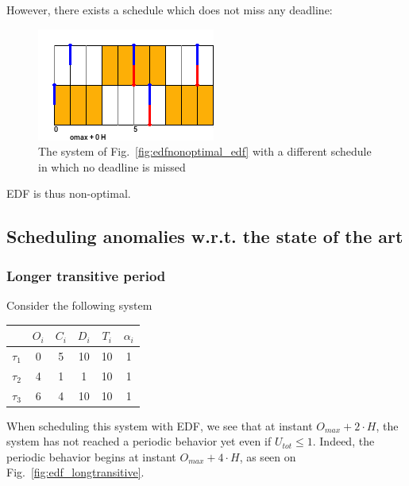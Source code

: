 \documentclass[a4paper,10pt]{article}
\begin{document}
        However, there exists a schedule which does not miss any deadline:\\

        \begin{figure}[H]
        \begin{center}
            \includegraphics{figs/edfNonOptimal_PALLF.png}
            \caption{The system of Fig.~\ref{fig:edfnonoptimal_edf} with a different schedule in which no deadline is missed}
            \label{fig:edfnonoptimal_pallf}
        \end{center}
        \end{figure}

        EDF is thus non-optimal.

    \subsection{Scheduling anomalies w.r.t. the state of the art}


        \subsubsection{Longer transitive period}
        Consider the following system

        \begin{center}
            \begin{tabular}{|r|c|c|c|c|c|}
                \hline
                            & $O_i$ & $C_i$ & $D_i$ & $T_i$ & $\alpha_i$ \\ \hline
                $\tau_1$    & 0     & 5     & 10   & 10    & 1     \\ \hline
                $\tau_2$    & 4     & 1     & 1    & 10    & 1     \\ \hline
                $\tau_3$    & 6     & 4     & 10   & 10    & 1     \\ \hline
            \end{tabular}
        \end{center}

        When scheduling this system with EDF, we see that at instant $O_{max} + 2 \cdot H$, the system has not reached a periodic behavior yet even if $U_{tot} \leqslant 1$. Indeed, the periodic behavior begins at instant $O_{max} + 4 \cdot H$, as seen on Fig.~\ref{fig:edf_longtransitive}.\\
\end{document}
